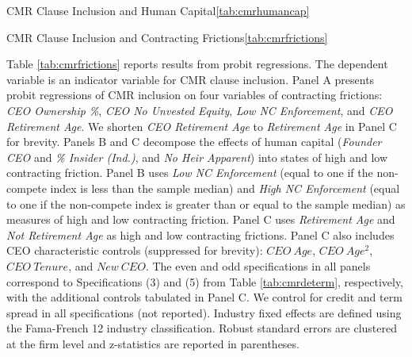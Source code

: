 \documentclass[a4paper,12pt]{article}
\begin{document}
\begin{singlespace}
\begin{papertable}{CMR Clause Inclusion and Human Capital}{\ref{tab:cmrhumancap}}{}
    \startdata
    
\end{papertable}


\begin{landscapepapertable}{CMR Clause Inclusion and Contracting Frictions}{\ref{tab:cmrfrictions}}{}   \label{tab:cmrfrictions}

    Table \ref{tab:cmrfrictions} reports results from probit regressions.
    The dependent variable is an indicator variable for CMR clause inclusion.
    Panel A presents probit regressions of CMR inclusion on four variables of contracting frictions: \textit{CEO Ownership \%}, \textit{CEO No Unvested Equity}, \textit{Low NC Enforcement}, and \textit{CEO Retirement Age}.
    We shorten \textit{CEO Retirement Age} to \textit{Retirement Age} in Panel C for brevity.
    Panels B and C decompose the effects of human capital (\textit{Founder CEO} and \textit{\% Insider (Ind.)}, and \textit{No Heir Apparent}) into states of high and low contracting friction.
    Panel B uses \textit{Low NC Enforcement} (equal to one if the non-compete index is less than the sample median) and   \textit{High NC Enforcement} (equal to one if the non-compete index is greater than or equal to the sample median) as measures of high and low contracting friction.
    Panel C uses \textit{Retirement Age} and \textit{Not Retirement Age} as high and low contracting frictions.
    Panel C also includes CEO characteristic controls (suppressed for brevity): $CEO\ Age$, $CEO\ Age^2$, $CEO\ Tenure$, and $New\ CEO$.
    The even and odd specifications in all panels correspond to Specifications (3) and (5) from Table \ref{tab:cmrdeterm}, respectively, with the additional controls tabulated in Panel C.
    We control for credit and term spread in all specifications (not reported).
    Industry fixed effects are defined using the Fama-French 12 industry classification.
    Robust standard errors are clustered at the firm level and z-statistics are reported in parentheses.
    \postamble
    

\end{landscapepapertable}
\end{singlespace}
\end{document}
